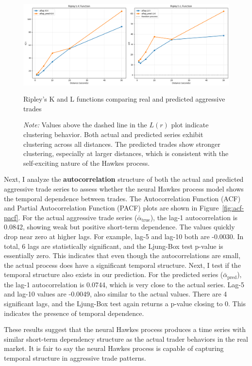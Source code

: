 \begin{figure}[tbp]
    \centering
    \includegraphics[width=\linewidth]{figures/RIPLEY_181330.png}
    \caption{Ripley's K and L functions comparing real and predicted aggressive trades}
    \caption*{\textit{Note:} Values above the dashed line in the \( L(r) \) plot indicate clustering behavior. Both actual and predicted series exhibit clustering across all distances. The predicted trades show stronger clustering, especially at larger distances, which is consistent with the self-exciting nature of the Hawkes process.}
    \label{fig:ripley-kl}
\end{figure}



Next, I analyze the \textbf{autocorrelation} structure of both the actual and predicted aggressive trade series to assess whether the neural Hawkes process model shows the temporal dependence between trades. The Autocorrelation Function (ACF) and Partial Autocorrelation Function (PACF) plots are shown in Figure~\ref{fig:acf-pacf}. For the actual aggressive trade series ($\bar{\alpha}_\text{true}$), the lag-1 autocorrelation is 0.0842, showing weak but positive short-term dependence. The values quickly drop near zero at higher lags. For example, lag-5 and lag-10 both are -0.0030. In total, 6 lags are statistically significant, and the Ljung-Box test p-value is essentially zero. This indicates that even though the autocorrelations are small, the actual process does have a significant temporal structure. Next, I test if the temporal structure also exists in our prediction. For the predicted series ($\bar{\alpha}_\text{pred}$), the lag-1 autocorrelation is 0.0744, which is very close to the actual series. Lag-5 and lag-10 values are -0.0049, also similar to the actual values. There are 4 significant lags, and the Ljung-Box test again returns a p-value closing to 0. This indicates the presence of temporal dependence.

These results suggest that the neural Hawkes process produces a time series with similar short-term dependency structure as the actual trader behaviors in the real market. It is fair to say the neural Hawkes process is capable of capturing temporal structure in aggressive trade patterns.

